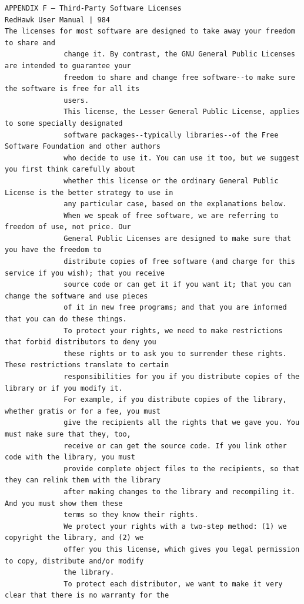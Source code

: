 \begin{lstlisting}[basicstyle=\ttfamily\scriptsize,breaklines=true]
APPENDIX F — Third-Party Software Licenses                                      RedHawk User Manual | 984
The licenses for most software are designed to take away your freedom to share and
              change it. By contrast, the GNU General Public Licenses are intended to guarantee your
              freedom to share and change free software--to make sure the software is free for all its
              users.
              This license, the Lesser General Public License, applies to some specially designated
              software packages--typically libraries--of the Free Software Foundation and other authors
              who decide to use it. You can use it too, but we suggest you first think carefully about
              whether this license or the ordinary General Public License is the better strategy to use in
              any particular case, based on the explanations below.
              When we speak of free software, we are referring to freedom of use, not price. Our
              General Public Licenses are designed to make sure that you have the freedom to
              distribute copies of free software (and charge for this service if you wish); that you receive
              source code or can get it if you want it; that you can change the software and use pieces
              of it in new free programs; and that you are informed that you can do these things.
              To protect your rights, we need to make restrictions that forbid distributors to deny you
              these rights or to ask you to surrender these rights. These restrictions translate to certain
              responsibilities for you if you distribute copies of the library or if you modify it.
              For example, if you distribute copies of the library, whether gratis or for a fee, you must
              give the recipients all the rights that we gave you. You must make sure that they, too,
              receive or can get the source code. If you link other code with the library, you must
              provide complete object files to the recipients, so that they can relink them with the library
              after making changes to the library and recompiling it. And you must show them these
              terms so they know their rights.
              We protect your rights with a two-step method: (1) we copyright the library, and (2) we
              offer you this license, which gives you legal permission to copy, distribute and/or modify
              the library.
              To protect each distributor, we want to make it very clear that there is no warranty for the

\end{lstlisting}
